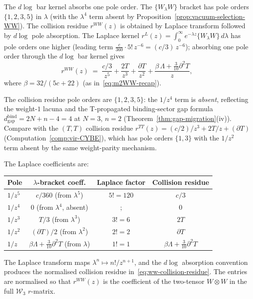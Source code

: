\begin{computation}
\label{comp:ww-collision-residue}
%
%
The $d\log$ bar kernel absorbs one pole order.
The $\{W_\lambda W\}$ bracket has pole orders
$\{1, 2, 3, 5\}$ in $\lambda$ (with the $\lambda^4$
term absent by
Proposition~\ref{prop:vacuum-selection-WW}). The
collision residue $r^{WW}(z)$ is obtained by Laplace
transform followed by $d\log$ pole absorption. The Laplace
kernel $r^{L}(z) = \int_0^\infty e^{-\lambda z}\{W_\lambda W\}\,d\lambda$
has pole orders one higher (leading term $\tfrac{c}{360}\cdot 5!\,z^{-6} = (c/3)\,z^{-6}$);
absorbing one pole order through the $d\log$ bar kernel gives
\begin{equation}
\label{eq:ww-collision-residue}
r^{WW}(z)
\;=\;
\frac{c/3}{z^5}
+ \frac{2T}{z^3}
+ \frac{\partial T}{z^2}
+ \frac{\beta\,\Lambda + \tfrac{3}{10}\partial^2 T}{z},
\end{equation}
where $\beta = 32/(5c + 22)$ (as in~\eqref{eq:m2WW-recap}).

The collision residue pole orders are $\{1, 2, 3, 5\}$:
the $1/z^4$ term is \emph{absent}, reflecting the
weight-$1$ lacuna and the T-propagated binding-sector gap formula
$d_{\mathrm{gap}}^{\mathrm{bind}} = 2N + n - 4 = 4$ at
$N = 3$, $n = 2$ (Theorem~\ref{thm:gap-migration}(iv)). Compare with the $(T,T)$ collision
residue $r^{TT}(z) = (c/2)/z^3 + 2T/z + (\partial T)$
\textup{(}Computation~\textup{\ref{comp:vir-CYBE})},
which has pole orders $\{1, 3\}$ with the $1/z^2$ term
absent by the same weight-parity mechanism.

The Laplace coefficients are:
\begin{center}
\small
\renewcommand{\arraystretch}{1.3}
\begin{tabular}{lccc}
\toprule
\textbf{Pole} & \textbf{$\lambda$-bracket coeff.}
 & \textbf{Laplace factor}
 & \textbf{Collision residue} \\
\midrule
$1/z^5$ & $c/360$ (from $\lambda^5$)
 & $5! = 120$ & $c/3$ \\
$1/z^4$ & $0$ (from $\lambda^4$, absent)
 &; & $0$ \\
$1/z^3$ & $T/3$ (from $\lambda^3$)
 & $3! = 6$ & $2T$ \\
$1/z^2$ & $(\partial T)/2$ (from $\lambda^2$)
 & $2! = 2$ & $\partial T$ \\
$1/z$ & $\beta\Lambda + \tfrac{3}{10}\partial^2 T$ (from $\lambda$)
 & $1! = 1$ & $\beta\Lambda + \tfrac{3}{10}\partial^2 T$ \\
\bottomrule
\end{tabular}
\end{center}

\noindent
The Laplace transform maps $\lambda^n \mapsto n!/z^{n+1}$,
and the $d\log$ absorption convention produces the
normalised collision residue
in~\eqref{eq:ww-collision-residue}.
The entries are normalised so that $r^{WW}(z)$ is the
coefficient of the two-tensor $W \otimes W$ in the full
$\mathcal{W}_3$ $r$-matrix.
\end{computation}

